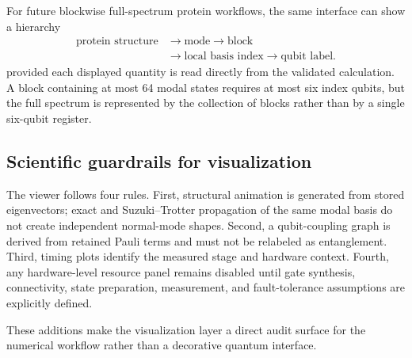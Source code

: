 \documentclass[aps,prx,reprint,10pt]{revtex4-2}
\begin{document}
For future blockwise full-spectrum protein workflows, the same interface can show a hierarchy
\begin{equation}
\begin{aligned}
\text{protein structure} &\rightarrow \text{mode} \rightarrow \text{block}\\
&\rightarrow \text{local basis index} \rightarrow \text{qubit label}.
\end{aligned}
\end{equation}
provided each displayed quantity is read directly from the validated calculation. A block containing at most 64 modal states requires at most six index qubits, but the full spectrum is represented by the collection of blocks rather than by a single six-qubit register.

\subsection{Scientific guardrails for visualization}
The viewer follows four rules. First, structural animation is generated from stored eigenvectors; exact and Suzuki--Trotter propagation of the same modal basis do not create independent normal-mode shapes. Second, a qubit-coupling graph is derived from retained Pauli terms and must not be relabeled as entanglement. Third, timing plots identify the measured stage and hardware context. Fourth, any hardware-level resource panel remains disabled until gate synthesis, connectivity, state preparation, measurement, and fault-tolerance assumptions are explicitly defined.

These additions make the visualization layer a direct audit surface for the numerical workflow rather than a decorative quantum interface.
\end{document}
